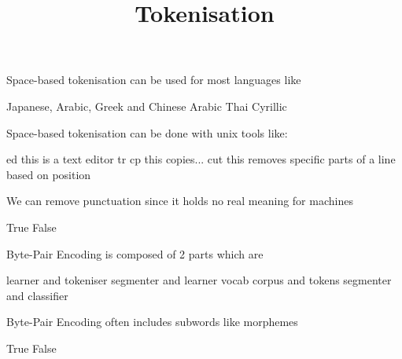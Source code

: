 \documentclass[theme=sleek, randomorder, hidesidemenu]{webquiz}
\title{Tokenisation}
\begin{document}
\begin{question}

  Space-based tokenisation can be used for most languages like

  \begin{choice}[multiple, columns=2]
    \incorrect Japanese, Arabic, Greek and Chinese
    \correct Arabic
    \incorrect Thai
    \correct Cyrillic
  \end{choice}

\end{question}

\begin{question}

  Space-based tokenisation can be done with unix tools like:

  \begin{choice}[columns=2]
    \incorrect ed \feedback this is a text editor
    \correct tr
    \incorrect cp \feedback this copies...
    \incorrect cut \feedback this removes specific parts of a line based on position
  \end{choice}

\end{question}

\begin{question}

  We can remove punctuation since it holds no real meaning for machines

  \begin{choice}[columns=2]
    \incorrect True
    \correct False
  \end{choice}

\end{question}

\begin{question}

  Byte-Pair Encoding is composed of 2 parts which are

  \begin{choice}[columns=2]
    \incorrect learner and tokeniser
    \correct segmenter and learner
    \incorrect vocab corpus and tokens
    \incorrect segmenter and classifier
  \end{choice}

\end{question}

\begin{question}

  Byte-Pair Encoding often includes subwords like morphemes

  \begin{choice}[columns=2]
    \correct True
    \incorrect False
  \end{choice}

\end{question}
\end{document}
